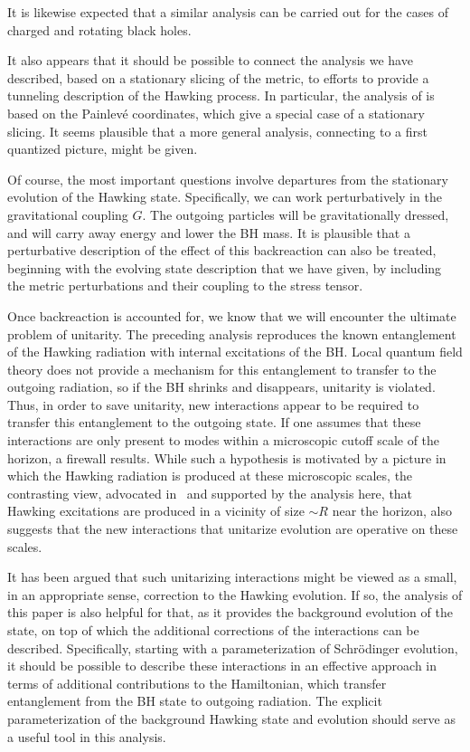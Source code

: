It is likewise expected that a similar analysis can be carried out for the cases of charged and rotating black holes.

It also appears that it should be possible to connect the analysis we have described, based on a stationary slicing of the metric, to efforts to provide a 
tunneling description of the Hawking process.  In particular, the analysis of  is based on the Painlev\'e coordinates, which give a special case of a stationary slicing.  It seems plausible that a more general analysis, connecting to a first quantized picture, might be given.

Of course, the most important questions involve departures from the stationary evolution of the Hawking state.  Specifically, we can work perturbatively in the gravitational coupling $G$.  The outgoing particles will be gravitationally dressed, and will carry away energy and lower the BH mass. It is plausible that a perturbative description of the effect of this backreaction can also be treated, beginning with the evolving state description that we have given, by including the metric perturbations and their coupling to the stress tensor.

Once backreaction is accounted for, we know that we will encounter the ultimate problem of unitarity.  The preceding analysis reproduces the known entanglement of the Hawking radiation with internal excitations of the BH.  Local quantum field theory does not provide a mechanism for this entanglement to transfer to the outgoing radiation, so if the BH shrinks and disappears, unitarity is violated.  Thus, in order to save unitarity, new interactions appear to be required to transfer this entanglement to the outgoing state.  If one assumes that these interactions are only present to modes within a microscopic cutoff scale of the horizon, a firewall results.  While such a hypothesis is motivated by a picture in which the Hawking radiation is produced at these microscopic scales, the contrasting view, advocated in \SGStBo\ and supported by the analysis here, that Hawking excitations are produced in  a vicinity of size $\sim R$ near the horizon, also suggests that the new interactions that unitarize evolution are operative on these scales.

It has been argued that such unitarizing interactions might be viewed as a small, in an appropriate sense, correction to the Hawking evolution.  If so, the analysis of this paper is also helpful for that, as it provides the background evolution of the state, on top of which the additional corrections of the interactions can be described.  Specifically, starting with a parameterization of  Schr\"odinger evolution, it should be possible to describe these interactions in an effective approach in terms of additional contributions to the Hamiltonian, which transfer entanglement from the BH state to outgoing radiation.  The explicit parameterization of the background Hawking state and evolution should serve as a useful tool in this analysis.




